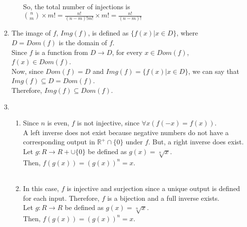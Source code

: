 \documentclass[a4paper]{article}
\begin{document}
\begin{enumerate}
\begin{enumerate}
        So, the total number of injections is $\binom{n}{m} \times m! = \frac{n!}{(n-m)!m!} \times m! = \frac{n!}{(n-m)!}$\\
        \end{enumerate}

        \item The image of $f$, $Img(f)$, is defined as $\{f(x) | x \in D\}$, where $D = Dom(f)$ is the domain of $f$.\\

        Since $f$ is a function from $D \rightarrow D$, for every $x \in Dom(f)$, $f(x) \in Dom(f)$.\\
        Now, since $Dom(f) = D$ and $Img(f) = \{f(x) | x \in D\}$, we can say that $Img(f) \subseteq D = Dom(f)$.\\

        Therefore, $Img(f) \subseteq Dom(f)$.\\

        \newpage
        \item \begin{enumerate}
            \item Since $n$ is even, $f$ is not injective, since $\forall x (f(-x) = f(x))$. \\
            
            A left inverse does not exist because negative numbers do not have a corresponding output in $\mathbb{R}^+ \cap \{0\}$ under $f$. But, a right inverse does exist.\\

            Let $g: R \rightarrow R + \cup \{0\}$ be defined as $g(x) = \sqrt[n]{x}$.\\
            Then, $f(g(x)) = (g(x))^n = x$.\\ \\

            \item In this case, $f$ is injective and surjection since a unique output is defined for each input. Therefore, $f$ is a bijection and a full inverse exists.\\
            
            Let $g: R \rightarrow R$ be defined as $g(x) = \sqrt[n]{x}$.\\
            Then, $f(g(x)) = (g(x))^n = x$.\\ \\


\end{enumerate}
\end{enumerate}
\end{document}
